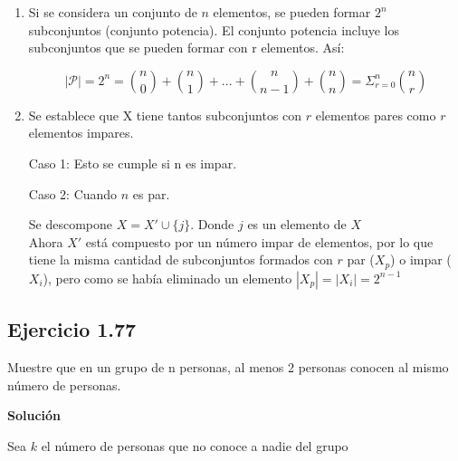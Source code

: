 \begin{enumerate}
	
\item Si se considera un conjunto de $n$ elementos, se pueden formar $2^n$
subconjuntos (conjunto potencia). El conjunto potencia incluye los subconjuntos
que se pueden formar con r elementos. Así:

\begin{equation*}
	|\mathcal{P}|=2^n=\binom{n}{0}+\binom{n}{1}+...+\binom{n}{n-1}+\binom{n}{n}=\Sigma_{r=0}^{n} \binom{n}{r}
\end{equation*} 

\item Se establece que X tiene tantos subconjuntos con $r$ elementos pares como
$r$ elementos impares.

Caso 1: Esto se cumple si n es impar.
	
Caso 2: Cuando $n$ es par.

Se descompone $X=X'\cup \{j\}$. Donde $j$ es un elemento de $X$\\
	
Ahora $X'$ está compuesto por un n\'umero impar de elementos, por lo que tiene
la misma cantidad de subconjuntos formados con $r$ par ($X_p$) o impar ($X_i$),
pero como se había eliminado un elemento $|X_p|=|X_i|=2^{n-1}$

\end{enumerate}

\subsection*{Ejercicio 1.77}

Muestre que en un grupo de n personas, al menos 2 personas conocen al mismo
n\'umero de personas.

\textbf{Solución}

Sea $k$ el n\'umero de personas que no conoce a nadie del grupo

